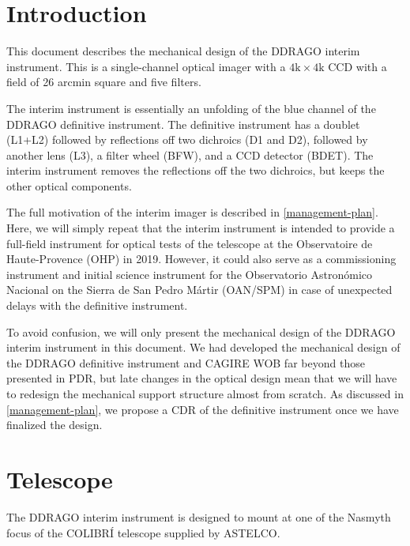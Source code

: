 \documentclass{article}
\begin{document}
\clearpage

\pagestyle{plain}

\tableofcontents
\clearpage

\listoffigures
\clearpage

\listoftables
\clearpage

\section{Introduction}

This document describes the mechanical design of the DDRAGO interim instrument. This is a single-channel optical imager with a $4\mathrm{k}\times4\mathrm{k}$ CCD with a field of 26 arcmin square and five filters. 

The interim instrument is essentially an unfolding of the blue channel of the DDRAGO definitive instrument. The definitive instrument has a doublet (L1+L2) followed by reflections off two dichroics (D1 and D2), followed by another lens (L3), a filter wheel (BFW), and a CCD detector (BDET). The interim instrument removes the reflections off the two dichroics, but keeps the other optical components.

The full motivation of the interim imager is described in \ref{management-plan}. Here, we will simply repeat that the interim instrument is intended to provide a full-field instrument for optical tests of the telescope at the Observatoire de Haute-Provence (OHP) in 2019. However, it could also serve as a commissioning instrument and initial science instrument for the Observatorio Astronómico Nacional on the Sierra de San Pedro Mártir (OAN/SPM) in case of unexpected delays with the definitive instrument.

To avoid confusion, we will only present the mechanical design of the DDRAGO interim instrument in this document. We had developed the mechanical design of the DDRAGO definitive instrument and CAGIRE WOB far beyond those presented in PDR, but late changes in the optical design mean that we will have to redesign the mechanical support structure almost from scratch. As discussed in \ref{management-plan}, we propose a CDR of the definitive instrument once we have finalized the design.

\clearpage
\section{Telescope}

The DDRAGO interim instrument is designed to mount at one of the Nasmyth focus of the COLIBRÍ telescope supplied by ASTELCO. 
\end{document}
